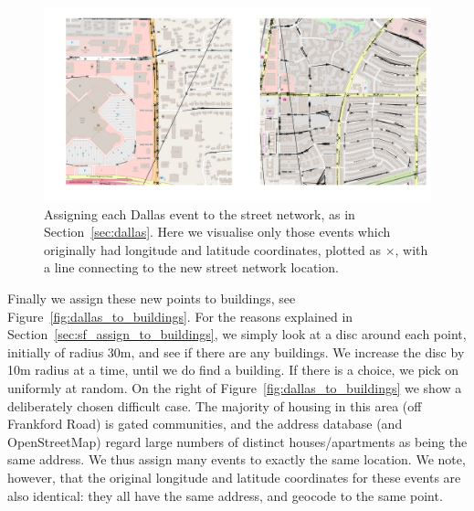 \documentclass[twoside,a4paper,twocolumn,10pt]{article}
\theoremstyle{plain}
\theoremstyle{definition}
\begin{document}
\begin{figure}
  \includegraphics[width=\textwidth]{dallas_coords_to_streets.png}
  \caption{Assigning each Dallas event to the street network, as in Section~\ref{sec:dallas}.
Here we visualise only those events which originally had longitude and latitude coordinates,
plotted as $\times$, with a line connecting to the new street network location.}
  \label{fig:dallas_to_streets}
\end{figure}

Finally we assign these new points to buildings, see Figure~\ref{fig:dallas_to_buildings}.
For the reasons explained in Section~\ref{sec:sf_assign_to_buildings},
we simply look at a disc around each point, initially of
radius 30m, and see if there are any buildings.  We increase the disc by 10m radius at a time,
until we do find a building.  If there is a choice, we pick on uniformly at random.
On the right of Figure~\ref{fig:dallas_to_buildings} we show a deliberately chosen difficult
case.  The majority of housing in this area (off Frankford Road) is gated communities, and the
address database (and OpenStreetMap) regard large numbers of distinct houses/apartments as being
the same address.  We thus assign many events to exactly the same location.  We note, however,
that the original longitude and latitude coordinates for these events are also identical:
they all have the same address, and geocode to the same point.
\end{document}
